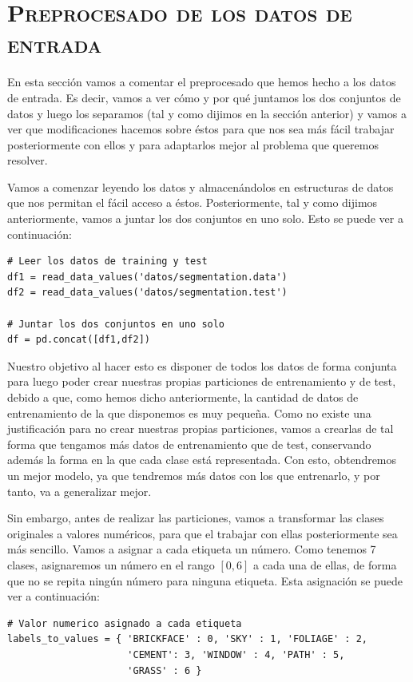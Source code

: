 \documentclass[11pt,a4paper]{article}
\begin{document}
\section{\textsc{Preprocesado de los datos de entrada}}

En esta sección vamos a comentar el preprocesado que hemos hecho a los datos de entrada. Es decir, vamos a ver cómo y por qué juntamos
los dos conjuntos de datos y luego los separamos (tal y como dijimos en la sección anterior) y vamos a ver que modificaciones hacemos
sobre éstos para que nos sea más fácil trabajar posteriormente con ellos y para adaptarlos mejor al problema que queremos resolver.

Vamos a comenzar leyendo los datos y almacenándolos en estructuras de datos que nos permitan el fácil acceso a éstos. Posteriormente,
tal y como dijimos anteriormente, vamos a juntar los dos conjuntos en uno solo. Esto se puede ver a continuación:

\begin{lstlisting}
# Leer los datos de training y test
df1 = read_data_values('datos/segmentation.data')
df2 = read_data_values('datos/segmentation.test')

# Juntar los dos conjuntos en uno solo
df = pd.concat([df1,df2])
\end{lstlisting}

Nuestro objetivo al hacer esto es disponer de todos los datos de forma conjunta para luego poder crear nuestras propias particiones de
entrenamiento y de test, debido a que, como hemos dicho anteriormente, la cantidad de datos de entrenamiento de la que disponemos es
muy pequeña. Como no existe una justificación para no crear nuestras propias particiones, vamos a crearlas de tal forma que tengamos más
datos de entrenamiento que de test, conservando además la forma en la que cada clase está representada. Con esto, obtendremos un 
mejor modelo, ya que tendremos más datos con los que entrenarlo, y por tanto, va a generalizar mejor.

Sin embargo, antes de realizar las particiones, vamos a transformar las clases originales a valores numéricos, para que el trabajar
con ellas posteriormente sea más sencillo. Vamos a asignar a cada etiqueta un número. Como tenemos 7 clases, asignaremos un número
en el rango $[0, 6]$ a cada una de ellas, de forma que no se repita ningún número para ninguna etiqueta. Esta asignación se puede ver a
continuación:

\begin{lstlisting}
# Valor numerico asignado a cada etiqueta
labels_to_values = { 'BRICKFACE' : 0, 'SKY' : 1, 'FOLIAGE' : 2,
                     'CEMENT': 3, 'WINDOW' : 4, 'PATH' : 5,
                     'GRASS' : 6 }
\end{lstlisting}
\end{document}
